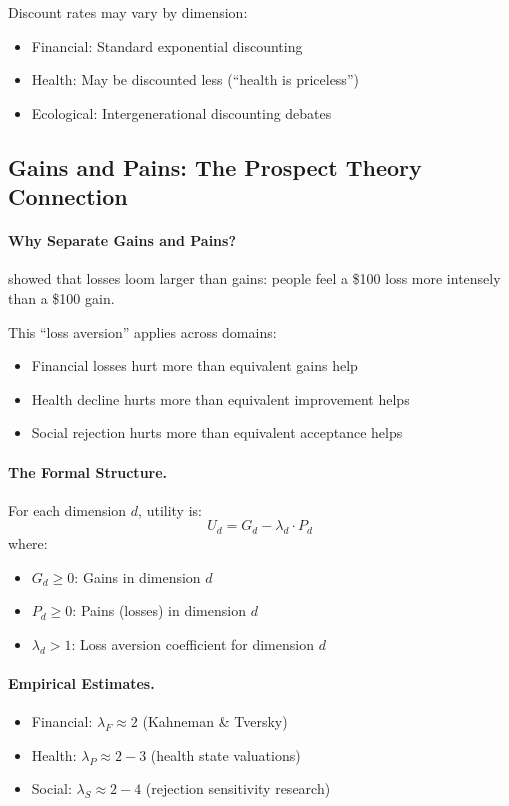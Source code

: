 \documentclass[12pt,a4paper]{article}
\begin{document}
Discount rates may vary by dimension:
\begin{itemize}
  \item Financial: Standard exponential discounting
  \item Health: May be discounted less (``health is priceless'')
  \item Ecological: Intergenerational discounting debates
\end{itemize}

\subsection{Gains and Pains: The Prospect Theory Connection}

\paragraph{Why Separate Gains and Pains?}
\citet{kahnemantversky1979} showed that losses loom larger than gains:
people feel a \$100 loss more intensely than a \$100 gain.

This ``loss aversion'' applies across domains:
\begin{itemize}
  \item Financial losses hurt more than equivalent gains help
  \item Health decline hurts more than equivalent improvement helps
  \item Social rejection hurts more than equivalent acceptance helps
\end{itemize}

\paragraph{The Formal Structure.}
For each dimension $d$, utility is:
\begin{equation}
  U_d = G_d - \lambda_d \cdot P_d
\end{equation}
where:
\begin{itemize}
  \item $G_d \geq 0$: Gains in dimension $d$
  \item $P_d \geq 0$: Pains (losses) in dimension $d$
  \item $\lambda_d > 1$: Loss aversion coefficient for dimension $d$
\end{itemize}

\paragraph{Empirical Estimates.}
\begin{itemize}
  \item Financial: $\lambda_F \approx 2$ (Kahneman \& Tversky)
  \item Health: $\lambda_P \approx 2-3$ (health state valuations)
  \item Social: $\lambda_S \approx 2-4$ (rejection sensitivity research)
\end{itemize}
\end{document}
